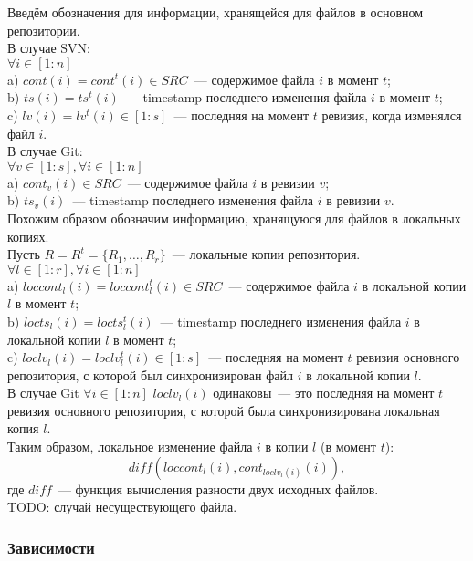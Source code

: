 Введём обозначения для информации, хранящейся для файлов в основном репозитории.\\
В случае SVN:\\
$\forall i \in [1:n]$\\
\indent a) $cont(i) = cont^t(i) \in SRC$~--- содержимое файла $i$ в момент $t$;\\
\indent b) $ts(i) = ts^t(i)$~--- timestamp последнего изменения файла $i$ в момент $t$;\\
\indent c) $lv(i) = lv^t(i) \in [1:s]$~--- последняя на момент $t$ ревизия, когда изменялся файл $i$.\\
В случае Git:\\
$\forall v \in [1:s], \forall i \in [1:n]$\\
\indent a) $cont_v(i) \in SRC$~--- содержимое файла $i$ в ревизии $v$;\\
\indent b) $ts_v(i)$~--- timestamp последнего изменения файла $i$ в ревизии $v$.\\

Похожим образом обозначим информацию, хранящуюся для файлов в локальных копиях.\\
Пусть $R = R^t = \{R_1, \dots, R_r\}$~--- локальные копии репозитория.\\
$\forall l \in [1:r], \forall i \in [1:n]$\\
\indent a) $loccont_l(i) = loccont_l^t(i) \in SRC$~--- содержимое файла $i$ в локальной копии $l$ в момент $t$;\\
\indent b) $locts_l(i) = locts_l^t(i)$~--- timestamp последнего изменения файла $i$ в локальной копии $l$ в момент $t$;\\
\indent c) $loclv_l(i) = loclv_l^t(i) \in {[1:s]}$~--- последняя на момент $t$ ревизия основного репозитория, с которой был синхронизирован файл $i$ в локальной копии $l$.\\
В случае Git $\forall i \in [1:n]$ $loclv_l(i)$ одинаковы~--- это последняя на момент $t$ ревизия основного репозитория, с которой была синхронизирована локальная копия $l$.\\

Таким образом, локальное изменение файла $i$ в копии $l$ (в момент $t$): $$\mathit{diff}(loccont_l(i), cont_{loclv_l(i)}(i)),$$ где $\mathit{diff}$~--- функция вычисления разности двух исходных файлов.\\
TODO: случай несуществующего файла.

\subsubsection{Зависимости}

